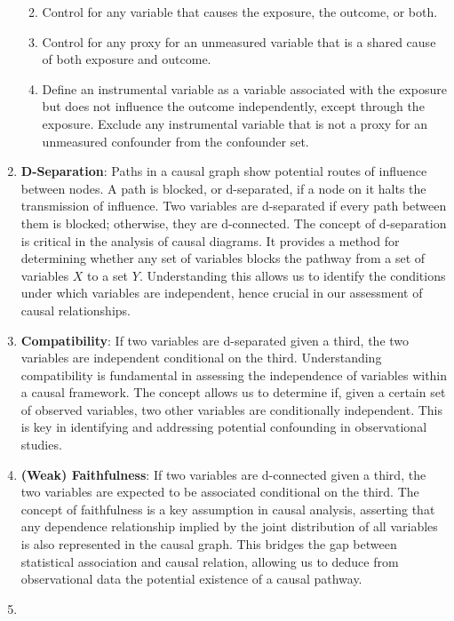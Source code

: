 \documentclass[
  singlecolumn]{report}
\begin{document}
\begin{enumerate}
  \begin{enumerate}
  \def\labelenumii{\alph{enumii}.}
  \item
    Control for any variable that causes the exposure, the outcome, or
    both.
  \item
    Control for any proxy for an unmeasured variable that is a shared
    cause of both exposure and outcome.
  \item
    Define an instrumental variable as a variable associated with the
    exposure but does not influence the outcome independently, except
    through the exposure. Exclude any instrumental variable that is not
    a proxy for an unmeasured confounder from the confounder set.
  \end{enumerate}
\item
  \textbf{D-Separation}: Paths in a causal graph show potential routes
  of influence between nodes. A path is blocked, or d-separated, if a
  node on it halts the transmission of influence. Two variables are
  d-separated if every path between them is blocked; otherwise, they are
  d-connected. The concept of d-separation is critical in the analysis
  of causal diagrams. It provides a method for determining whether any
  set of variables blocks the pathway from a set of variables \(X\) to a
  set \(Y\). Understanding this allows us to identify the conditions
  under which variables are independent, hence crucial in our assessment
  of causal relationships.
\item
  \textbf{Compatibility}: If two variables are d-separated given a
  third, the two variables are independent conditional on the third.
  Understanding compatibility is fundamental in assessing the
  independence of variables within a causal framework. The concept
  allows us to determine if, given a certain set of observed variables,
  two other variables are conditionally independent. This is key in
  identifying and addressing potential confounding in observational
  studies.
\item
  \textbf{(Weak) Faithfulness}: If two variables are d-connected given a
  third, the two variables are expected to be associated conditional on
  the third. The concept of faithfulness is a key assumption in causal
  analysis, asserting that any dependence relationship implied by the
  joint distribution of all variables is also represented in the causal
  graph. This bridges the gap between statistical association and causal
  relation, allowing us to deduce from observational data the potential
  existence of a causal pathway.
\item

\end{enumerate}
\end{document}

